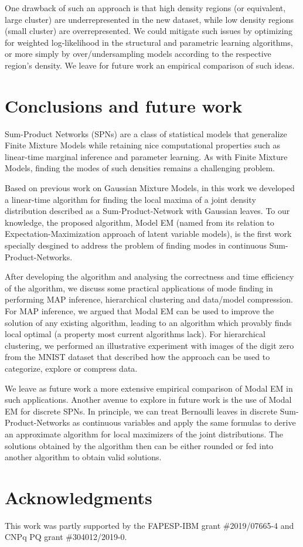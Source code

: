 \documentclass[12pt]{article}
\begin{document}
One drawback of such an approach is that high density regions (or equivalent, large cluster) are underrepresented in the new dataset, while low density regions (small cluster) are overrepresented.
We could mitigate such issues by optimizing for weighted log-likelihood in the structural and parametric learning algorithms, or more simply by over/undersampling models according to the respective region's density.
We leave for future work an empirical comparison of such ideas.

\section{Conclusions and future work}
\label{sec:conclusion}

Sum-Product Networks (SPNs) are a class of statistical models that generalize Finite Mixture Models while retaining nice computational properties such as linear-time marginal inference and parameter learning.
As with Finite Mixture Models, finding the modes of such densities remains a challenging problem.

Based on previous work on Gaussian Mixture Models, in this work we developed a linear-time algorithm for finding the local maxima of a joint density distribution described as a Sum-Product-Network with Gaussian leaves.
To our knowledge, the proposed algorithm, Model EM (named from its relation to Expectation-Maximization approach of latent variable models), is the first work specially desgined to address the problem of finding modes in continuous Sum-Product-Networks.

After developing the algorithm and analysing the correctness and time efficiency of the algorithm, we discuss some practical applications of mode finding in performing MAP inference,  hierarchical clustering and data/model compression.
For MAP inference, we argued that Modal EM can be used to improve the solution of any existing algorithm, leading to an algorithm which provably finds local optimal (a property most current algorithms lack).
For hierarchical clustering, we performed an illustrative experiment with images of the digit zero from the MNIST dataset that described how the approach can be used to categorize, explore or compress data.

We leave as future work a more extensive empirical comparison of Modal EM in such applications.
Another avenue to explore in future work is the use of Modal EM for discrete SPNs.
In principle, we can treat Bernoulli leaves in discrete Sum-Product-Networks as continuous variables and apply the same formulas to derive an approximate algorithm for local maximizers of the joint distributions.
The solutions obtained by the algorithm then can be either rounded or fed into another algorithm to obtain valid solutions.


\section*{Acknowledgments}

This work was partly supported by the FAPESP-IBM grant \#2019/07665-4 and CNPq PQ grant \#304012/2019-0.



\end{document}
